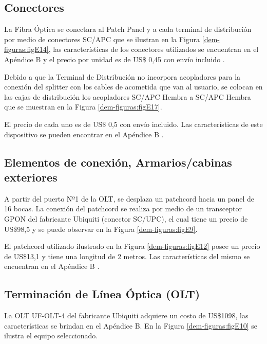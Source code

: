 \subsection{Conectores}
La Fibra Óptica se conectara al Patch Panel y a cada terminal de distribución por medio de conectores SC/APC que se ilustran en la Figura \ref{dem-figuras:figE14}, las características de los conectores utilizados se encuentran en el Apéndice B \cite{apendice-b} y el precio por unidad es de US\$ 0,45 con envío incluido \cite{conector-sc-apc}.

Debido a que la Terminal de Distribución no incorpora acopladores para la conexión del splitter con los cables de acometida que van al usuario, se colocan en las cajas de distribución los acopladores SC/APC Hembra a SC/APC Hembra que se muestran en la Figura \ref{dem-figuras:figE17}.

El precio de cada uno es de US\$ 0,5 \cite{acople-sc-apc} con envío incluido. Las características de este dispositivo se pueden encontrar en el Apéndice B \cite{apendice-b}.


\subsection{Elementos de conexión, Armarios/cabinas exteriores}
A partir del puerto Nº1 de la OLT, se desplaza un patchcord hacia un panel de 16 bocas. La conexión del  patchcord se realiza por medio de un transceptor GPON del fabricante Ubiquiti (conector SC/UPC), el cual tiene un precio de  US\$98,5 \cite{transceptor} y se puede observar en la Figura \ref{dem-figuras:figE9}.


El patchcord utilizado ilustrado en la Figura \ref{dem-figuras:figE12} posee un precio de US\$13,1 \cite{patchcord-sc-apc} y tiene una longitud de 2 metros. Las características del mismo se encuentran en el Apéndice B \cite{apendice-b}.


\subsection{Terminación de Línea Óptica (OLT)}
La OLT UF-OLT-4 del fabricante Ubiquiti adquiere un costo de US\$1098, las características se brindan en el Apéndice B. En la Figura \ref{dem-figuras:figE10} se ilustra el equipo seleccionado.

